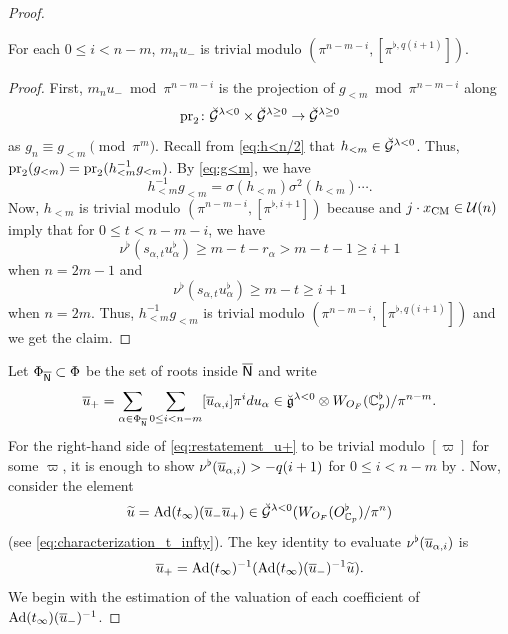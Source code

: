 \documentclass[12pt,reqno]{amsart}
\begin{document}
\begin{proof}
\begin{lem} \label{lem:valmn<m}
    For each $0 \leq i < n - m$, $m_n u_-$ is trivial modulo $(\pi^{n - m - i}, [\pi^{\flat, q(i+1)}])$. 
\end{lem}
\begin{proof}
    First, $m_n u_- \bmod \pi^{n - m - i}$ is the projection of $g_{< m} \bmod \pi^{n-m-i}$ along 
    \[
        {\operatorname{pr}}_2 \colon {\mathcal{\breve{G}}}^{\lambda < 0} \times {\mathcal{\breve{G}}}^{\lambda \geq 0} \to {\mathcal{\breve{G}}}^{\lambda \geq 0}
    \]
    as $g_n \equiv g_{<m} \pmod{\pi^m}$. Recall from \eqref{eq:h<n/2} that $h_{<m} \in {\mathcal{\breve{G}}}^{\lambda < 0}$. Thus, ${\operatorname{pr}}_2(g_{<m}) = {\operatorname{pr}}_2(h_{<m}^{-1}g_{<m})$. By \eqref{eq:g<m}, we have 
    \[
        h_{<m}^{-1} g_{<m} = \sigma(h_{<m}) \sigma^2(h_{<m}) \cdots. 
    \]
    Now, $h_{<m}$ is trivial modulo  $(\pi^{n - m - i}, [\pi^{\flat, i+1}])$ because  and $j \cdot x_{{\operatorname{CM}}} \in {\mathcal{U}}(n)$ imply that for $0 \leq t < n - m - i$, we have 
    \[
        \nu^\flat(s_{\alpha, t}u_\alpha^\flat) \geq m - t - r_\alpha > m - t - 1 \geq i + 1
    \]
    when $n = 2m - 1$ and
    \[
        \nu^\flat(s_{\alpha, t}u_\alpha^\flat) \geq m - t \geq i + 1
    \]
    when $n = 2m$. Thus, $h_{<m}^{-1} g_{<m}$ is trivial modulo $(\pi^{n - m - i}, [\pi^{\flat, q(i+1)}])$ and we get the claim. 
\end{proof}
    Let $\Phi_{{\mathsf{{\overline{N}}}}} \subset \Phi$ be the set of roots inside ${\mathsf{{\overline{N}}}}$ and write 
    \[
        {\overline{u}}_+ = \sum_{\alpha \in \Phi_{{\mathsf{{\overline{N}}}}}} \sum_{0 \leq i < n - m} [{\overline{u}}_{\alpha,i}] \pi^i du_\alpha \in {\mathfrak{\breve{g}}}^{\lambda < 0} \otimes W_{O_F}(\mathbb{C}_p^\flat)/\pi^{n-m}. 
    \]
    For the right-hand side of \eqref{eq:restatement_u+} to be trivial modulo $[\varpi]$ for some $\varpi$, it is enough to show $\nu^\flat({\overline{u}}_{\alpha, i}) > -q(i+1)$ for $0 \leq i < n - m$ by . Now, consider the element
    \[
        {\widetilde{u}} = {\operatorname{Ad}}(t_\infty)({\overline{u}}_-{\overline{u}}_+) \in {\mathcal{\breve{G}}}^{\lambda < 0 }(W_{O_F}(O_{\mathbb{C}_p}^\flat) / \pi^n)
    \]
    (see \eqref{eq:characterization_t_infty}). The key identity to evaluate $\nu^\flat({\overline{u}}_{\alpha, i})$ is 
    \begin{equation} \label{eq:expression_u+}
        {\overline{u}}_+ = {\operatorname{Ad}}(t_\infty)^{-1}({\operatorname{Ad}}(t_\infty)({\overline{u}}_-)^{-1} {\widetilde{u}}). 
    \end{equation}
    We begin with the estimation of the valuation of each coefficient of ${\operatorname{Ad}}(t_\infty)({\overline{u}}_-)^{-1}$. 


\end{proof}
\end{document}
